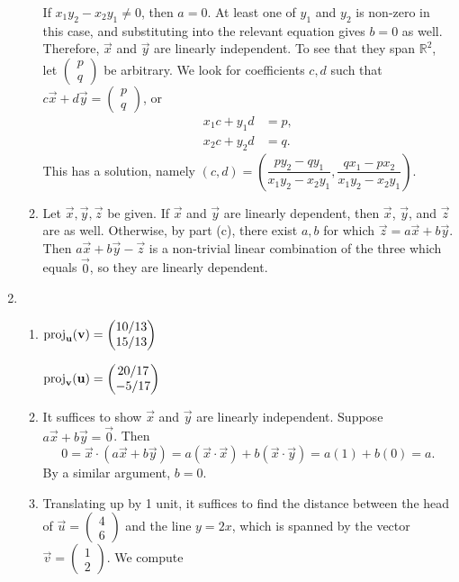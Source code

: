 \begin{enumerate}
\begin{enumerate}
\begin{itemize}
\end{itemize}
If $x_1y_2 - x_2y_1\neq 0$, then $a = 0$. At least one of $y_1$ and $y_2$ is non-zero in this case, and substituting into the relevant equation gives $b = 0$ as well. Therefore, $\vec{x}$ and $\vec{y}$ are linearly independent. To see that they span $\mathbb{R}^2$, let $\begin{pmatrix} p \\ q \end{pmatrix}$ be arbitrary. We look for coefficients $c,d$ such that $c\vec{x} + d\vec{y} = \begin{pmatrix} p \\ q \end{pmatrix}$, or
\begin{align*}
x_1c + y_1d &= p, \\
x_2c + y_2d &= q.
\end{align*}
This has a solution, namely $(c,d) = \left(\dfrac{py_2 - qy_1}{x_1y_2 - x_2y_1}, \dfrac{qx_1 - px_2}{x_1y_2 - x_2y_1}\right)$.
\item Let $\vec{x},\vec{y},\vec{z}$ be given. If $\vec{x}$ and $\vec{y}$ are linearly dependent, then $\vec{x}$, $\vec{y}$, and $\vec{z}$ are as well. Otherwise, by part (c), there exist $a,b$ for which $\vec{z} = a\vec{x} + b\vec{y}$. Then $a\vec{x} + b\vec{y} - \vec{z}$ is a non-trivial linear combination of the three which equals $\vec{0}$, so they are linearly dependent.
\end{enumerate}
\item \begin{enumerate}
\item $\operatorname{proj}_{\mathbf{u}}(\mathbf{v}) = \begin{pmatrix} 10/13 \\ 15/13 \end{pmatrix}$\par
$\operatorname{proj}_{\mathbf{v}}(\mathbf{u}) = \begin{pmatrix} 20/17 \\ -5/17 \end{pmatrix}$
\item It suffices to show $\vec{x}$ and $\vec{y}$ are linearly independent. Suppose $a\vec{x} + b\vec{y} = \vec{0}$. Then
\begin{equation*}
0 = \vec{x}\cdot (a\vec{x} + b\vec{y}) = a(\vec{x}\cdot\vec{x}) + b(\vec{x}\cdot\vec{y}) = a(1) + b(0) = a.
\end{equation*}
By a similar argument, $b = 0$.
\item Translating up by 1 unit, it suffices to find the distance between the head of $\vec{u} = \begin{pmatrix} 4 \\ 6 \end{pmatrix}$ and the line $y = 2x$, which is spanned by the vector $\vec{v} = \begin{pmatrix} 1 \\ 2 \end{pmatrix}$. We compute

\end{enumerate}
\end{enumerate}
